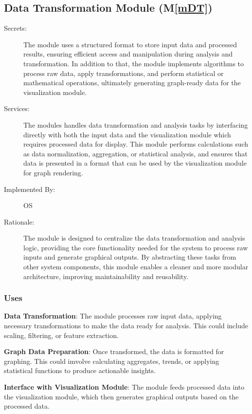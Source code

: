 \documentclass[12pt, titlepage]{article}
\newcommand{\mref}[1]{M\ref{#1}}
\begin{document}
\subsection{Data Transformation Module (\mref{mDT})}
\begin{description}
  \item[Secrets:] The module uses a structured format to store input data and processed results, ensuring
  efficient access and manipulation during analysis and transformation. In addition to that, the module implements
  algorithms to process raw data, apply transformations, and perform statistical or mathematical operations,
  ultimately generating graph-ready data for the visualization module.
  \item[Services:] The modules handles data transformation and analysis tasks by interfacing directly with both 
  the input data and the visualization module which requires processed data for display. This module performs 
  calculations such as data normalization, aggregation, or statistical analysis, and ensures that data is presented 
  in a format that can be used by the visualization module for graph rendering.
  \item[Implemented By:] OS
  \item[Rationale:] The module is designed to centralize the data transformation and analysis logic, providing the core 
  functionality needed for the system to process raw inputs and generate graphical outputs. By abstracting these tasks 
  from other system components, this module enables a cleaner and more modular architecture, improving maintainability 
  and reusability.
\end{description}

\subsubsection{Uses}
\begin{description}
  \item \textbf{Data Transformation}: The module processes raw input data, applying necessary transformations to make 
  the data ready for analysis. This could include scaling, filtering, or feature extraction.
  \item \textbf{Graph Data Preparation}: Once transformed, the data is formatted for graphing. This could imvolve calculating 
  aggregates, trends, or applying statistical functions to produce actionable insights.
  \item \textbf{Interface with Visualization Module}: The module feeds processed data into the visualization module, which 
  then generates graphical outputs based on the processed data.
\end{description}
\end{document}
